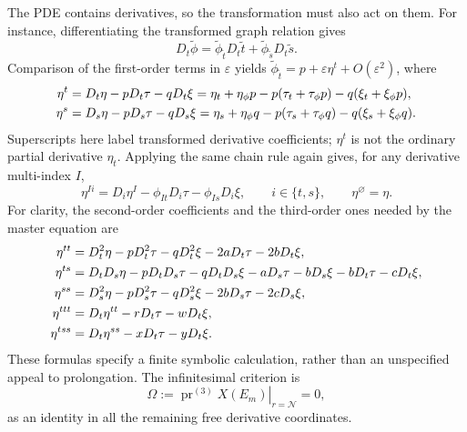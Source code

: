 \documentclass[11pt]{article}
\theoremstyle{definition}
\newcommand{\pr}{\operatorname{pr}}
\begin{document}
The PDE contains derivatives, so the transformation must also act on them.
For instance, differentiating the transformed graph relation gives
\[
 D_t\widetilde\phi
   =\widetilde\phi_{\widetilde t}D_t\widetilde t
       +\widetilde\phi_{\widetilde s}D_t\widetilde s.
\]
Comparison of the first-order terms in $\varepsilon$ yields
$\widetilde\phi_{\widetilde t}=p+\varepsilon\eta^t+O(\varepsilon^2)$,
where
\begin{align}
 \eta^t&=D_t\eta-pD_t\tau-qD_t\xi
       =\eta_t+\eta_\phi p-p(\tau_t+\tau_\phi p)
                              -q(\xi_t+\xi_\phi p),\notag\\
 \eta^s&=D_s\eta-pD_s\tau-qD_s\xi
       =\eta_s+\eta_\phi q-p(\tau_s+\tau_\phi q)
                              -q(\xi_s+\xi_\phi q).
 \label{eq:sve-first-prolongation}
\end{align}
Superscripts here label transformed derivative coefficients; $\eta^t$ is
not the ordinary partial derivative $\eta_t$. Applying the same chain rule
again gives, for any derivative multi-index $I$,
\begin{equation}
 \eta^{Ii}=D_i\eta^I-\phi_{It}D_i\tau-\phi_{Is}D_i\xi,
 \qquad i\in\{t,s\},\qquad \eta^\varnothing=\eta.
 \label{eq:sve-prolongation-recursion}
\end{equation}
For clarity, the second-order coefficients and the third-order ones needed
by the master equation are
\begin{align}
 \eta^{tt}&=D_t^2\eta-pD_t^2\tau-qD_t^2\xi
                          -2aD_t\tau-2bD_t\xi,\notag\\
 \eta^{ts}&=D_tD_s\eta-pD_tD_s\tau-qD_tD_s\xi
                    -aD_s\tau-bD_s\xi-bD_t\tau-cD_t\xi,\notag\\
 \eta^{ss}&=D_s^2\eta-pD_s^2\tau-qD_s^2\xi
                          -2bD_s\tau-2cD_s\xi,\notag\\
 \eta^{ttt}&=D_t\eta^{tt}-rD_t\tau-wD_t\xi,\notag\\
 \eta^{tss}&=D_t\eta^{ss}-xD_t\tau-yD_t\xi.
 \label{eq:sve-higher-prolongation}
\end{align}
These formulas specify a finite symbolic calculation, rather than an
unspecified appeal to prolongation. The infinitesimal criterion
\cite{olver,oliveri2026} is
\begin{equation}
 \Omega:=\left.\pr^{(3)}X(E_m)\right|_{r=\mathcal N}=0,
 \label{eq:sve-omega}
\end{equation}
as an identity in all the remaining free derivative coordinates.
\end{document}
